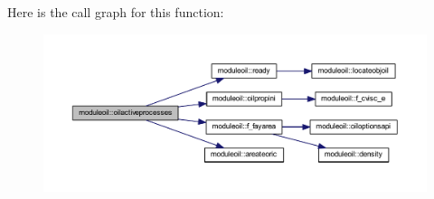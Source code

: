 Here is the call graph for this function\+:\nopagebreak
\begin{figure}[H]
\begin{center}
\leavevmode
\includegraphics[width=350pt]{namespacemoduleoil_aa53749d5416d21d1602ffd0208f0f8f2_cgraph}
\end{center}
\end{figure}
\mbox{\label{namespacemoduleoil_a4b104a789e2f264a4494966c5b9a47fd}} 
